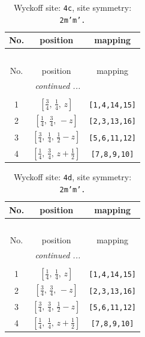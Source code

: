 \documentclass[fleqn,8pt]{jsarticle}
\begin{document}
\renewcommand{\arraystretch}{1.2}
\begin{longtable}{ccc}
\caption{Wyckoff site: {\tt 4c}, site symmetry: {\tt 2m'm'.}}
 \\
 \hline \hline
No. & position & mapping \\ \hline \endfirsthead

\multicolumn{2}{l}{\tablename\ \thetable{}} \\
 \hline \hline
No. & position & mapping \\ \hline \endhead

 \hline \hline
\multicolumn{2}{r}{\footnotesize\it continued ...} \\ \endfoot

 \hline \hline
\multicolumn{2}{r}{} \\ \endlastfoot

1 & $\left[ \frac{3}{4},\, \frac{1}{4},\, z \right]$ & {\tt [1,4,14,15]} \\ \hline
2 & $\left[ \frac{1}{4},\, \frac{3}{4},\, - z \right]$ & {\tt [2,3,13,16]} \\ \hline
3 & $\left[ \frac{3}{4},\, \frac{1}{4},\, \frac{1}{2} - z \right]$ & {\tt [5,6,11,12]} \\ \hline
4 & $\left[ \frac{1}{4},\, \frac{3}{4},\, z + \frac{1}{2} \right]$ & {\tt [7,8,9,10]} \\
\end{longtable}
\renewcommand{\arraystretch}{1.2}
\begin{longtable}{ccc}
\caption{Wyckoff site: {\tt 4d}, site symmetry: {\tt 2m'm'.}}
 \\
 \hline \hline
No. & position & mapping \\ \hline \endfirsthead

\multicolumn{2}{l}{\tablename\ \thetable{}} \\
 \hline \hline
No. & position & mapping \\ \hline \endhead

 \hline \hline
\multicolumn{2}{r}{\footnotesize\it continued ...} \\ \endfoot

 \hline \hline
\multicolumn{2}{r}{} \\ \endlastfoot

1 & $\left[ \frac{1}{4},\, \frac{1}{4},\, z \right]$ & {\tt [1,4,14,15]} \\ \hline
2 & $\left[ \frac{3}{4},\, \frac{3}{4},\, - z \right]$ & {\tt [2,3,13,16]} \\ \hline
3 & $\left[ \frac{3}{4},\, \frac{3}{4},\, \frac{1}{2} - z \right]$ & {\tt [5,6,11,12]} \\ \hline
4 & $\left[ \frac{1}{4},\, \frac{1}{4},\, z + \frac{1}{2} \right]$ & {\tt [7,8,9,10]} \\
\end{longtable}
\end{document}
